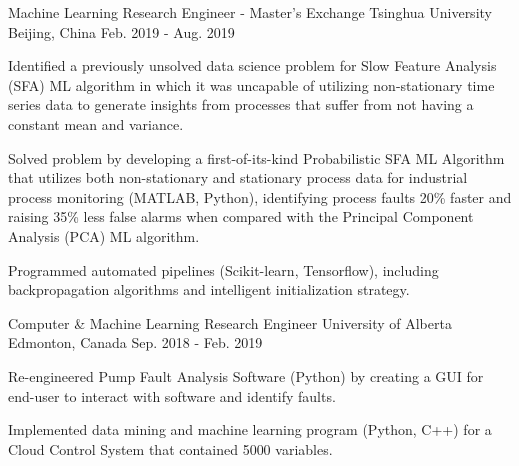 

\begin{cventries}

  \cventry
    {Machine Learning Research Engineer - Master's Exchange} %
    {Tsinghua University} %
    {Beijing, China} %
    {Feb. 2019 - Aug. 2019} %
    {
      \begin{cvitems} %
        \item{Identified a previously unsolved data science problem for Slow Feature Analysis (SFA) ML algorithm in which it was uncapable of utilizing non-stationary time series data to generate insights from processes that suffer from not having a constant mean and variance.}
        \item {Solved problem by developing a first-of-its-kind Probabilistic SFA ML Algorithm that utilizes both non-stationary and stationary process data for industrial process monitoring (MATLAB, Python), identifying process faults 20\% faster and raising 35\% less false alarms when compared with the Principal Component Analysis (PCA) ML algorithm.}
        \item {Programmed automated pipelines (Scikit-learn, Tensorflow), including backpropagation algorithms and intelligent initialization strategy.}
      \end{cvitems}
    }

  \cventry
    {Computer \& Machine Learning Research Engineer} %
    {University of Alberta} %
    {Edmonton, Canada} %
    {Sep. 2018 - Feb. 2019} %
    {
      \begin{cvitems} %
        \item {Re-engineered Pump Fault Analysis Software (Python) by creating a GUI for end-user to  interact with software and identify faults.}
        \item {Implemented data mining and machine learning program (Python, C++) for a Cloud Control System that contained 5000 variables.}        
      \end{cvitems}
    }


\end{cventries}

